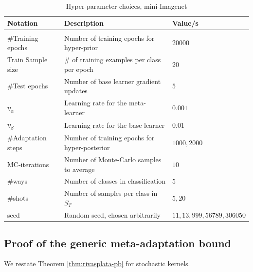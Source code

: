 \documentclass{article} %
\theoremstyle{definition}
\begin{document}
\begin{table}[ht]	
	
	\centering
 \caption{Hyper-parameter choices, mini-Imagenet}
	\label{table:hyper-params-inet}
	\begin{tabular}{lll}
		
		Notation   & Description  & Value/s   \\ \hline \\
		\#Training epochs & Number of training epochs for hyper-prior   & $20000$      \\
		\midrule
		Train Sample size & \# of training examples per class per epoch   & $20$      \\
		\midrule
		\#Test epochs & Number of base learner gradient updates   & $5$      \\
		\midrule
		$\eta_{\alpha}$  & Learning rate for the meta-learner   & $0.001$      \\
		\midrule
		$\eta_{\beta}$  & Learning rate for the base learner   & $0.01$      \\
		\midrule
		\#Adaptation steps  & Number of training epochs for hyper-posterior   & $1000, 2000$      \\
		\midrule
		MC-iterations & Number of Monte-Carlo samples to average & $10$\\
		\midrule
		\#ways & Number of classes in classification & $5$\\
		\midrule
		\#shots & Number of samples per class in $S_T$ & $5,20$\\
		\midrule
		seed & Random seed, chosen arbitrarily & $11,13,999,56789,306050$\\
		\bottomrule
	\end{tabular}
	
\end{table}

\subsection{Proof of the generic meta-adaptation bound} \label{append:proof-main-result}

We restate Theorem \ref{thm:rivasplata-pb} for stochastic kernels. 
\end{document}
